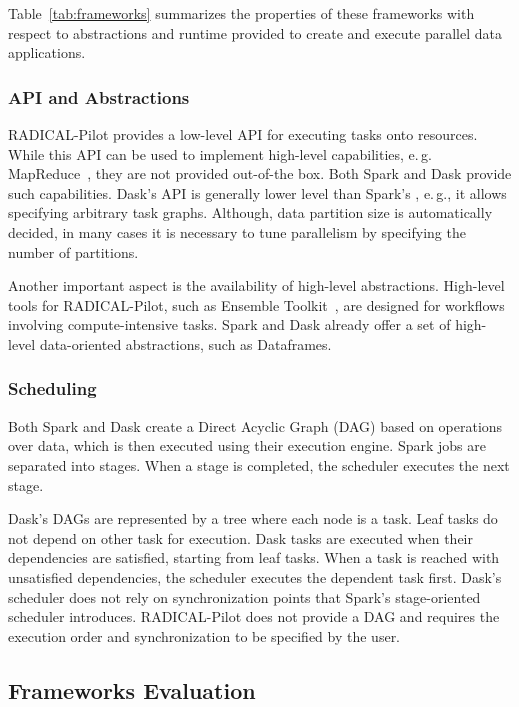 Table~\ref{tab:frameworks} summarizes the properties of these frameworks with respect to abstractions and runtime provided to create and execute parallel data applications. 

\subsubsection*{API and Abstractions} 
RADICAL-Pilot provides a low-level API for executing tasks onto resources.
While this API can be used to implement high-level capabilities, e.\,g. MapReduce~\cite{mantha2012pilot}, they are not provided out-of-the box.
Both Spark and Dask provide such capabilities.
Dask's API is generally lower level than Spark's , e.\,g., it allows specifying arbitrary task graphs.
Although, data partition size is automatically decided, in many cases it is necessary to tune parallelism by specifying the number of partitions.

Another important aspect is the availability of high-level abstractions.
High-level tools for RADICAL-Pilot, such as Ensemble Toolkit~\cite{balasubramanian2018harnessing}, are designed for workflows involving compute-intensive tasks.
Spark and Dask already offer a set of high-level data-oriented abstractions, such as Dataframes.

\subsubsection*{Scheduling}
Both Spark and Dask create a Direct Acyclic Graph (DAG) based on operations over data, which is then executed using their execution engine.
Spark jobs are separated into stages.
When a stage is completed, the scheduler executes the next stage.

Dask's DAGs are represented by a tree where each node is a task.
Leaf tasks do not depend on other task for execution.
Dask tasks are executed when their dependencies are satisfied, starting from leaf tasks.
When a task is reached with unsatisfied dependencies, the scheduler executes the dependent task first.
Dask's scheduler does not rely on synchronization points that Spark's stage-oriented scheduler introduces.
RADICAL-Pilot does not provide a DAG and requires the execution order and synchronization to be specified by the user.

\subsection{Frameworks Evaluation}
\label{sec:framework_eval}

